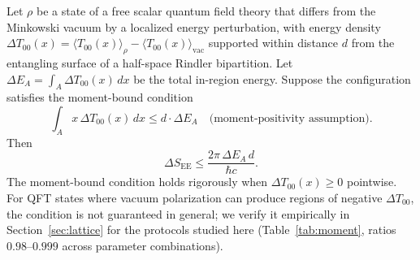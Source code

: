 \documentclass[11pt]{article}
\begin{document}
\begin{theorem}
\label{thm:escrow}
Let $\rho$ be a state of a free scalar quantum field theory that differs from the Minkowski vacuum by a localized energy perturbation, with energy density $\Delta T_{00}(x) = \langle T_{00}(x)\rangle_\rho - \langle T_{00}(x)\rangle_{\mathrm{vac}}$ supported within distance $d$ from the entangling surface of a half-space Rindler bipartition. Let $\Delta E_A = \int_A \Delta T_{00}(x)\, dx$ be the total in-region energy. Suppose the configuration satisfies the moment-bound condition
\begin{equation}
\int_A x\, \Delta T_{00}(x)\, dx \leq d \cdot \Delta E_A \quad \text{(moment-positivity assumption)}.
\label{eq:moment_assumption}
\end{equation}
Then
\begin{equation}
\Delta S_{\mathrm{EE}} \leq \frac{2\pi \, \Delta E_A \, d}{\hbar c}.
\label{eq:escrow_inequality}
\end{equation}
The moment-bound condition holds rigorously when $\Delta T_{00}(x) \geq 0$ pointwise. For QFT states where vacuum polarization can produce regions of negative $\Delta T_{00}$, the condition is not guaranteed in general; we verify it empirically in Section~\ref{sec:lattice} for the protocols studied here (Table~\ref{tab:moment}, ratios $0.98$--$0.999$ across parameter combinations).
\end{theorem}
\end{document}

